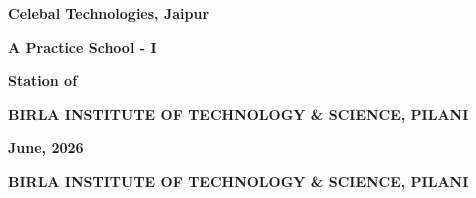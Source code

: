 \documentclass{book}
\begin{document}









\vspace*{1cm}
        \centerline{\bf Celebal Technologies, Jaipur} %
	\vspace{0.2cm}
	\centerline{\bf A Practice School - I}
	\vspace{0.2cm}
	\centerline{\bf Station of}
	\vspace{0.5cm}
\begin{figure}[ht]
\epsfxsize=1.0in
\centerline{}
\end{figure}

	\centerline{\bf BIRLA INSTITUTE OF TECHNOLOGY \& SCIENCE, PILANI}
	\vspace*{0.5cm}
	\centerline{\bf June, 2026} %
	\newpage

\thispagestyle{empty}

	\centerline{\bf BIRLA INSTITUTE OF TECHNOLOGY \& SCIENCE, PILANI}
	\vspace*{0.2cm}
	
\end{document}
